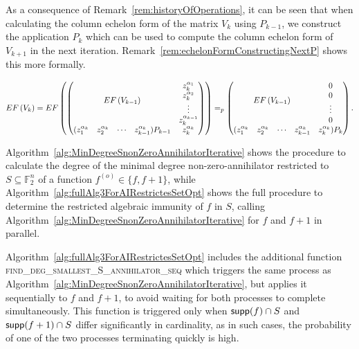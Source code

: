 \documentclass[11pt]{llncs}
\begin{document}
As a consequence of Remark~\ref{rem:historyOfOperations}, it can be seen that when calculating the column echelon form of the matrix $V_k$ using $P_{k-1}$, we construct the application $P_k$ which can be used to compute the column echelon form of $V_{k+1}$ in the next iteration. Remark~\ref{rem:echelonFormConstructingNextP} shows this more formally.

\begin{remark}\label{rem:echelonFormConstructingNextP}
    \begin{align*}
        EF\left(V_{k}\right) =
        EF
        \begin{pmatrix}
        \begin{pmatrix}
            \multicolumn{4}{c}{\multirow{4}{*}{$EF\left(V_{k-1}\right)$}} & z_k^{\alpha_1}\\
            & & & & z_k^{\alpha_2}\\
            & & & & \vdots\\
            & & & & z_{k}^{\alpha_{k-1}}\\
            (z_1^{\alpha_{k}} & z_2^{\alpha_{k}}& \cdots & z_{k-1}^{\alpha_{k}})P_{k-1} & z_{k}^{\alpha_k}
        \end{pmatrix}
        \end{pmatrix}
        =_p 
        \begin{pmatrix}
            \multicolumn{4}{c}{\multirow{4}{*}{$EF\left(V_{k-1}\right)$}} & 0\\
            & & & & 0\\
            & & & & \vdots\\
            & & & & 0\\
            (z_1^{\alpha_{k}} & z_2^{\alpha_{k}}& \cdots & z_{k-1}^{\alpha_{k}} & z_{k}^{\alpha_k})P_{k}
        \end{pmatrix}.
    \end{align*}
\end{remark}

Algorithm~\ref{alg:MinDegreeSnonZeroAnnihilatorIterative} shows the procedure to calculate the degree of the minimal degree non-zero-annihilator 
restricted to $S\subseteq \mathbb{F}_2^n$ of a function $f^{(o)} \in \{f, f+ 1\}$, while Algorithm~\ref{alg:fullAlg3ForAIRestrictesSetOpt} shows the full procedure to determine the restricted algebraic immunity of $f$ in $S$, calling Algorithm~\ref{alg:MinDegreeSnonZeroAnnihilatorIterative} for $f$ and $f+ 1$ in parallel.

Algorithm~\ref{alg:fullAlg3ForAIRestrictesSetOpt} includes the additional function \textsc{find\_deg\_smallest\_S\_annihilator\_seq} which triggers the same process as Algorithm~\ref{alg:MinDegreeSnonZeroAnnihilatorIterative}, but applies it sequentially to $f$ and $f + 1$, to avoid waiting for both processes to complete simultaneously. This function is triggered only when $\mathsf{supp}(f) \cap S$ and $\mathsf{supp}(f + 1) \cap S$ differ significantly in cardinality, as in such cases, the probability of one of the two processes terminating quickly is high.
\end{document}
